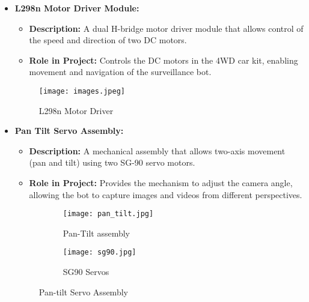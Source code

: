 \documentclass[12pt]{article}
\begin{document}
\begin{itemize}
    \item \textbf{L298n Motor Driver Module:}
    \begin{itemize}
        \item \textbf{Description:} A dual H-bridge motor driver module that allows control of the speed and direction of two DC motors.
        \item \textbf{Role in Project:} Controls the DC motors in the 4WD car kit, enabling movement and navigation of the surveillance bot.
    \end{itemize}
    \begin{figure}[h]
        \centering
        \texttt{[image: images.jpeg]}
        \caption{L298n Motor Driver}
        \label{fig:enter-label}
    \end{figure}
    \newpage
    \item \textbf{Pan Tilt Servo Assembly:}
    \begin{itemize}
        \item \textbf{Description:} A mechanical assembly that allows two-axis movement (pan and tilt) using two SG-90 servo motors.
        \item \textbf{Role in Project:} Provides the mechanism to adjust the camera angle, allowing the bot to capture images and videos from different perspectives.
    \end{itemize}
    \begin{figure}[htbp]
    \centering
    \begin{subfigure}[b]{0.45\textwidth}
        \centering
        \texttt{[image: pan\_tilt.jpg]}
        \caption{Pan-Tilt assembly}
        \label{fig:enter-label}
    \end{subfigure}
    \hfill
    \begin{subfigure}[b]{0.45\textwidth}
        \centering
        \texttt{[image: sg90.jpg]}
        \caption{SG90 Servos}
        \label{fig:enter-label}
    \end{subfigure}
    \caption{Pan-tilt Servo Assembly}
    \label{fig:side_by_side}
    \end{figure}


\end{itemize}
\end{document}
